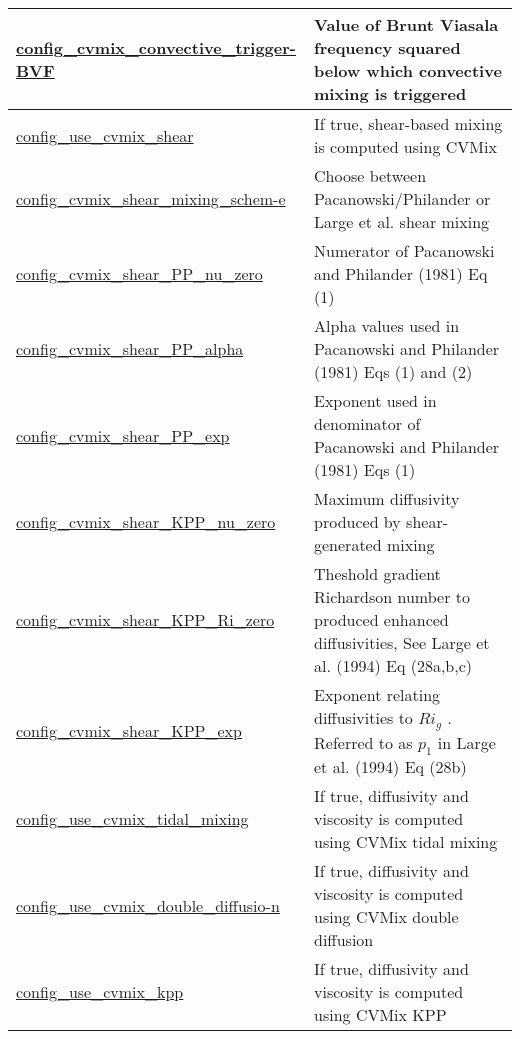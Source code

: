 {\begin{center}
\begin{longtable}{| p{2.0in} || p{4.0in} |}
	\hline
	\hyperref[sec:nm_sec_config_cvmix_convective_triggerBVF]{config\_cvmix\_convective\_trigger-}\hyperref[sec:nm_sec_config_cvmix_convective_triggerBVF]{BVF}& Value of Brunt Viasala frequency squared below which convective mixing is triggered \\
	\hline
	\hyperref[sec:nm_sec_config_use_cvmix_shear]{config\_use\_cvmix\_shear} & If true, shear-based mixing is computed using CVMix \\
	\hline
	\hyperref[sec:nm_sec_config_cvmix_shear_mixing_scheme]{config\_cvmix\_shear\_mixing\_schem-}\hyperref[sec:nm_sec_config_cvmix_shear_mixing_scheme]{e}& Choose between Pacanowski/Philander or Large et al. shear mixing \\
	\hline
	\hyperref[sec:nm_sec_config_cvmix_shear_PP_nu_zero]{config\_cvmix\_shear\_PP\_nu\_zero} & Numerator of Pacanowski and Philander (1981) Eq (1) \\
	\hline
	\hyperref[sec:nm_sec_config_cvmix_shear_PP_alpha]{config\_cvmix\_shear\_PP\_alpha} & Alpha values used in Pacanowski and Philander (1981) Eqs (1) and (2) \\
	\hline
	\hyperref[sec:nm_sec_config_cvmix_shear_PP_exp]{config\_cvmix\_shear\_PP\_exp} & Exponent used in denominator of Pacanowski and Philander (1981) Eqs (1) \\
	\hline
	\hyperref[sec:nm_sec_config_cvmix_shear_KPP_nu_zero]{config\_cvmix\_shear\_KPP\_nu\_zero} & Maximum diffusivity produced by shear-generated mixing \\
	\hline
	\hyperref[sec:nm_sec_config_cvmix_shear_KPP_Ri_zero]{config\_cvmix\_shear\_KPP\_Ri\_zero} & Theshold gradient Richardson number to produced enhanced diffusivities, See Large et al. (1994) Eq (28a,b,c) \\
	\hline
	\hyperref[sec:nm_sec_config_cvmix_shear_KPP_exp]{config\_cvmix\_shear\_KPP\_exp} &  Exponent relating diffusivities to  $Ri_g$ . Referred to as  $p_1$  in Large et al. (1994) Eq (28b) \\
	\hline
	\hyperref[sec:nm_sec_config_use_cvmix_tidal_mixing]{config\_use\_cvmix\_tidal\_mixing} & If true, diffusivity and viscosity is computed using CVMix tidal mixing \\
	\hline
	\hyperref[sec:nm_sec_config_use_cvmix_double_diffusion]{config\_use\_cvmix\_double\_diffusio-}\hyperref[sec:nm_sec_config_use_cvmix_double_diffusion]{n}& If true, diffusivity and viscosity is computed using CVMix double diffusion \\
	\hline
	\hyperref[sec:nm_sec_config_use_cvmix_kpp]{config\_use\_cvmix\_kpp} & If true, diffusivity and viscosity is computed using CVMix KPP \\

\end{longtable}
\end{center}}
